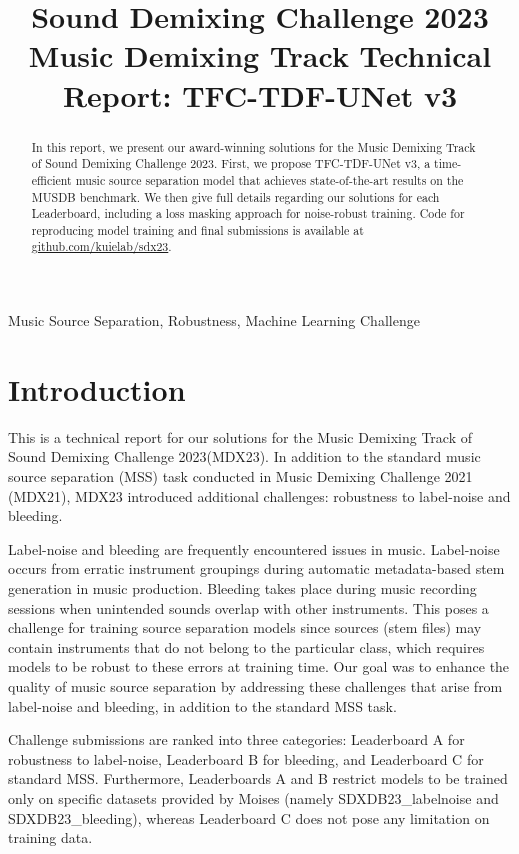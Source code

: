 \documentclass[10pt]{article}
\title{Sound Demixing Challenge 2023 Music Demixing Track Technical Report: TFC-TDF-UNet v3}
\begin{document}
\maketitle
\begin{abstract}
In this report, we present our award-winning solutions for the Music Demixing Track of Sound Demixing Challenge 2023.
First, we propose TFC-TDF-UNet v3, a time-efficient music source separation model that achieves state-of-the-art results on the MUSDB benchmark. We then give full details regarding our solutions for each Leaderboard, including a loss masking approach for noise-robust training. Code for reproducing model training and final submissions is available at \url{github.com/kuielab/sdx23}.

\end{abstract}
\begin{keywords}
Music Source Separation, Robustness, Machine Learning Challenge
\end{keywords}
\section{Introduction}
\label{sec:intro}
This is a technical report for our solutions for the Music Demixing Track of Sound Demixing Challenge 2023\footnotemark[1] (MDX23). In addition to the standard music source separation (MSS) task conducted in Music Demixing Challenge 2021\cite{mdx21} (MDX21), MDX23 introduced additional challenges: robustness to label-noise and bleeding. 


Label-noise and bleeding are frequently encountered issues in music. 
Label-noise occurs from erratic instrument groupings during automatic metadata-based stem generation in music production. 
Bleeding takes place during music recording sessions when unintended sounds overlap with other instruments. 
This poses a challenge for training source separation models since sources (stem files) may contain instruments that do not belong to the particular class, which requires models to be robust to these errors at training time. Our goal was to enhance the quality of music source separation by addressing these challenges that arise from label-noise and bleeding, in addition to the standard MSS task.

Challenge submissions are ranked into three categories: Leaderboard A for robustness to label-noise, Leaderboard B for bleeding, and Leaderboard C for standard MSS. Furthermore, Leaderboards A and B restrict models to be trained only on specific datasets provided by Moises (namely SDXDB23\_labelnoise and SDXDB23\_bleeding), whereas Leaderboard C does not pose any limitation on training data. 
\end{document}
